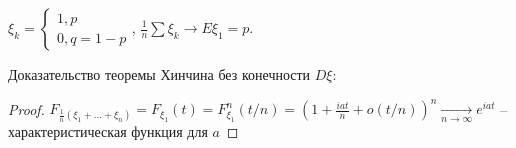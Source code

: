 \begin{theorem}[Бернулли]
$\xi_k = \begin{cases} 1, p \\ 0, q = 1 - p \end{cases}$, $\frac 1n\sum \xi_k \to E\xi_1 = p$.
\end{theorem}

Доказательство теоремы Хинчина без конечности $D\xi$:
\begin{proof}
    $F_{\frac1n(\xi_1 + \dots + \xi_n)} = F_{\xi_1}(t) = F_{\xi_1}^n(t/n) = (1 + \frac{iat}{n} + o(t/n))^n \xrightarrow[n \to \infty]{} e^{iat}$ -- характеристическая функция для $a$
\end{proof}                                                                                                                                                                           

